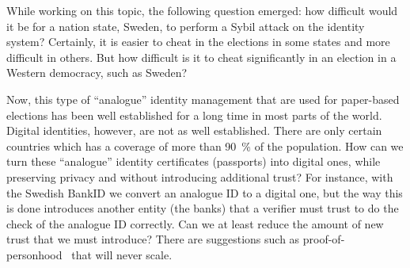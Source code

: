 While working on this topic, the following question emerged:
how difficult would it be for a nation state, \eg Sweden, to perform a Sybil 
attack on the identity system?
Certainly, it is easier to cheat in the elections in some states and more 
difficult in others.
But how difficult is it to cheat significantly in an election in a Western 
democracy, such as Sweden?

Now, this type of \enquote{analogue} identity management that are used for 
paper-based elections has been well established for a long time in most parts 
of the world.
Digital identities, however, are not as well established.
There are only certain countries which has a coverage of more than \SI{90}{\%} 
of the population.
How can we turn these \enquote{analogue} identity certificates (\eg passports) 
into digital ones, while preserving privacy and without introducing additional 
trust?
For instance, with the Swedish BankID we convert an analogue ID to a digital 
one, but the way this is done introduces another entity (the banks) that a 
verifier must trust to do the check of the analogue ID correctly.
Can we at least reduce the amount of new trust that we must introduce?
There are suggestions such as proof-of-personhood~\cite{proof-of-personhood} 
that will never scale.

